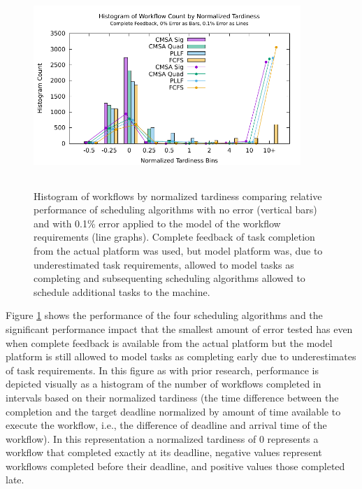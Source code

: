 \documentclass[10pt]{csce}
\begin{document}
\begin{figure}
	\begin{center}
		\includegraphics[width=0.9\textwidth,height=3in]{figures/Histogram_All_NoLoss_NoBias_LowError.pdf}
	\end{center}
	\caption{Histogram of workflows by normalized tardiness comparing
		relative performance of scheduling algorithms with no error (vertical
		bars) and with 0.1\% error applied to the model of the workflow
		requirements (line graphs).  Complete feedback of task completion from
		the actual platform was used, but model platform was, due to
		underestimated task requirements, allowed to model tasks as completing
		and subsequenting scheduling algorithms allowed to schedule additional
		tasks to the machine.}
	\label{fig:noloss-nobias-lowerror}
\end{figure}

Figure \ref{fig:noloss-nobias-lowerror} shows the performance of the four
scheduling algorithms and the significant performance impact that the smallest
amount of error tested has even when complete feedback is available from the
actual platform but the model platform is still allowed to model tasks as
completing early due to underestimates of task requirements. In this figure
as with prior research, performance is depicted visually as a histogram of the
number of workflows completed in intervals based on their normalized tardiness
(the time difference between the completion and the target deadline normalized
by amount of time available to execute the workflow, i.e., the difference of
deadline and arrival time of the workflow). In this representation a normalized
tardiness of 0 represents a workflow that completed exactly at its deadline,
negative values represent workflows completed before their deadline, and
positive values those completed late.
\end{document}
